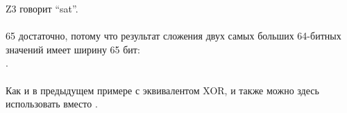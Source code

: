 Z3 говорит ``sat''.\\
\\
65 достаточно, потому что результат сложения двух самых больших 64-битных значений имеет ширину 65 бит: \\
.\\
\\
Как и в предыдущем примере с эквивалентом XOR,  и  также можно здесь использовать
вместо .

